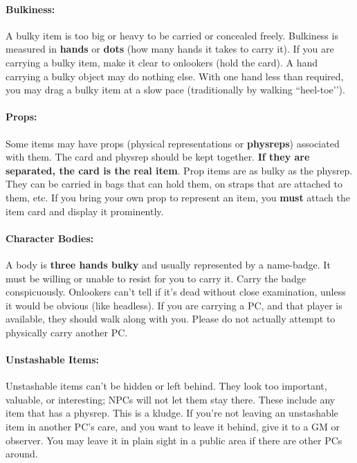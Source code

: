 \documentclass[sheet]{GL2020}
\begin{document}
\paragraph{Bulkiness:} A bulky item is too big or heavy to be carried or concealed freely.  Bulkiness is measured in {\bf hands} or {\bf dots} (how many hands it takes to carry it).  If you are carrying a bulky item, make it clear to onlookers (hold the card).  A hand carrying a bulky object may do nothing else.  With one hand less than required, you may drag a bulky item at a slow pace (traditionally by walking ``heel-toe’’).

\paragraph{Props:} Some items may have props (physical representations or \textbf{physreps}) associated with them.  The card and physrep should be kept together. \textbf{If they are separated, the card is the real item}. Prop items are as bulky as the physrep. They can be carried in bags that can hold them, on straps that are attached to them, etc. If you bring your own prop to represent an item, you \textbf{must} attach the item card and display it prominently.

\paragraph{Character Bodies:} A body is {\bf three hands bulky} and usually represented by a name-badge.  It must be willing or unable to resist for you to carry it.  Carry the badge conspicuously. Onlookers can't tell if it's dead without close examination, unless it would be
obvious (like headless). If you are carrying a PC, and that player is available, they should walk along with you. Please do not actually attempt to physically carry another PC.

\paragraph{Unstashable Items:} Unstashable items can't be hidden or left behind. They look too important, valuable, or interesting; NPCs will not let them stay there. These include any item that has a physrep. This is a kludge. If you're not leaving an unstashable item in another PC's care, and you want to leave it behind, give it to a GM or observer. You may leave it in plain sight in a public area if there are other PCs around.

\clearpage
\end{document}
